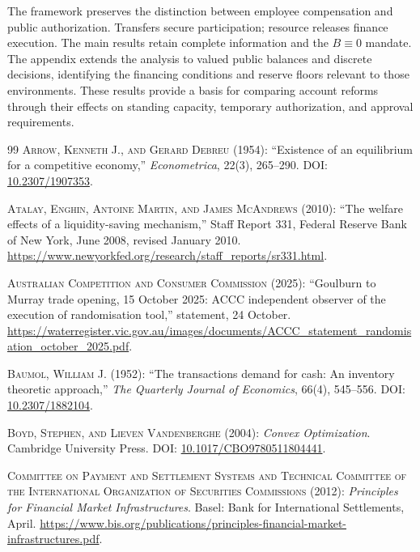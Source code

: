 \documentclass[ecta,draft]{econsocart}
\theoremstyle{definition}
\theoremstyle{definition}
\begin{document}
The framework preserves the distinction between employee compensation and
public authorization. Transfers secure participation; resource releases
finance execution. The main results retain complete information and the
$B\equiv0$ mandate. The appendix extends the analysis to valued public
balances and discrete decisions, identifying the financing conditions and
reserve floors relevant to those environments. These results provide a basis
for comparing account reforms through their effects on standing capacity,
temporary authorization, and approval requirements.


\begin{thebibliography}{99}
\textsc{Arrow, Kenneth J., and Gerard Debreu} (1954): ``Existence of an equilibrium for a competitive economy,'' \emph{Econometrica}, 22(3), 265--290. DOI: \url{10.2307/1907353}.

\textsc{Atalay, Enghin, Antoine Martin, and James McAndrews} (2010):
``The welfare effects of a liquidity-saving mechanism,'' Staff Report 331,
Federal Reserve Bank of New York, June 2008, revised January 2010.
\url{https://www.newyorkfed.org/research/staff_reports/sr331.html}.


\textsc{Australian Competition and Consumer Commission} (2025):
``Goulburn to Murray trade opening, 15 October 2025: ACCC independent observer
of the execution of randomisation tool,'' statement, 24 October.
\url{https://waterregister.vic.gov.au/images/documents/ACCC_statement_randomisation_october_2025.pdf}.

\textsc{Baumol, William J.} (1952): ``The transactions demand for cash: An inventory theoretic approach,'' \emph{The Quarterly Journal of Economics}, 66(4), 545--556. DOI: \url{10.2307/1882104}.

\textsc{Boyd, Stephen, and Lieven Vandenberghe} (2004): \emph{Convex Optimization}. Cambridge University Press. DOI: \url{10.1017/CBO9780511804441}.

\textsc{Committee on Payment and Settlement Systems and Technical Committee of the International Organization of Securities Commissions} (2012):
\emph{Principles for Financial Market Infrastructures}. Basel: Bank for International Settlements, April.
\url{https://www.bis.org/publications/principles-financial-market-infrastructures.pdf}.


\end{thebibliography}
\end{document}
